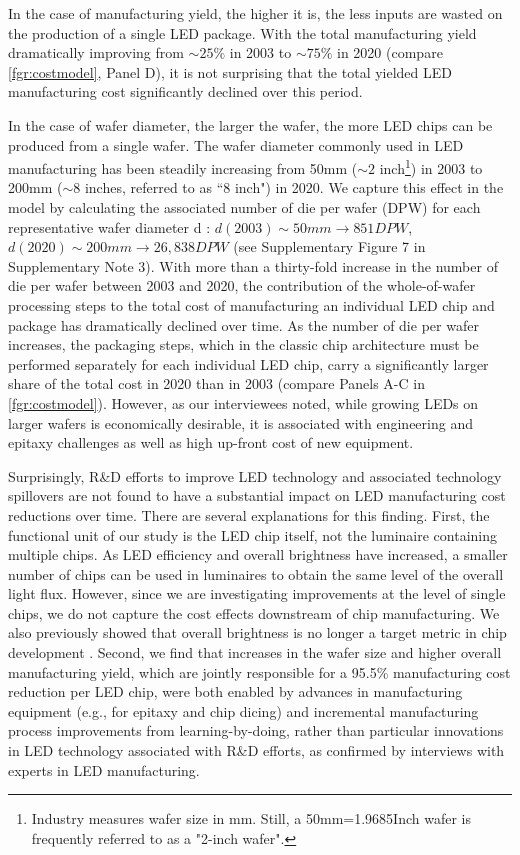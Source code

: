 \documentclass[parskip=full]{article}
\begin{document}
In the case of manufacturing yield, the higher it is, the less inputs are wasted on the production of a single LED package. With the total manufacturing yield dramatically improving from $\sim25\%$ in 2003 to $\sim75\%$ in 2020 (compare \cref{fgr:costmodel}, Panel D), it is not surprising that the total yielded LED manufacturing cost significantly declined over this period.

In the case of wafer diameter, the larger the wafer, the more LED chips can be produced from a single wafer. The wafer diameter commonly used in LED manufacturing has been steadily increasing from 50mm ($\sim2$ inch\footnote{Industry measures wafer size in mm. Still, a 50mm=1.9685Inch wafer is frequently referred to as a "2-inch wafer".}) in 2003 to 200mm ($\sim$8 inches, referred to as “8 inch") in 2020. We capture this effect in the model by calculating the associated number of die per wafer (DPW) for each representative wafer diameter d \cite{de2005investigation}: $d(2003)\sim 50 mm \rightarrow851 DPW$, $d(2020)\sim200 mm \rightarrow 26,838 DPW$ (see Supplementary Figure 7 in Supplementary Note 3). With more than a thirty-fold increase in the number of die per wafer between 2003 and 2020, the contribution of the whole-of-wafer processing steps to the total cost of manufacturing an individual LED chip and package has dramatically declined over time. As the number of die per wafer increases, the packaging steps, which in the classic chip architecture must be performed separately for each individual LED chip, carry a significantly larger share of the total cost in 2020 than in 2003 (compare Panels A-C in \cref{fgr:costmodel}). However, as our interviewees noted, while growing LEDs on larger wafers is economically desirable, it is associated with engineering and epitaxy challenges as well as high up-front cost of new equipment.

Surprisingly, R\&D efforts to improve LED technology and associated technology spillovers are not found to have a substantial impact on LED manufacturing cost reductions over time. There are several explanations for this finding. First, the functional unit of our study is the LED chip itself, not the luminaire containing multiple chips. As LED efficiency and overall brightness have increased, a smaller number of chips can be used in luminaires to obtain the same level of the overall light flux. However, since we are investigating improvements at the level of single chips, we do not capture the cost effects downstream of chip manufacturing. We also previously showed that overall brightness is no longer a target metric in chip development \cite{weinold2021compound}. Second, we find that increases in the wafer size and higher overall manufacturing yield, which are jointly responsible for a 95.5\% manufacturing cost reduction per LED chip, were both enabled by advances in manufacturing equipment (e.g., for epitaxy and chip dicing) and incremental manufacturing process improvements from learning-by-doing, rather than particular innovations in LED technology associated with R\&D efforts, as confirmed by interviews with experts in LED manufacturing.
\end{document}
